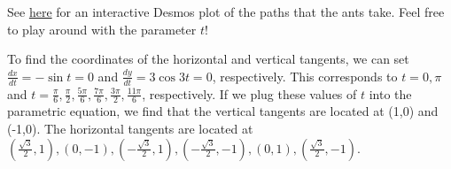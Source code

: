 \begin{enumerate}
\begin{figure}[!ht]
        \end{figure}

        See \href{https://www.desmos.com/calculator/xdoroqqzdz}{here} for an interactive Desmos plot of the paths that the ants take. Feel free to play around with the parameter $t$!
        
        To find the coordinates of the horizontal and vertical tangents, we can set $\frac{dx}{dt}=-\sin{t}=0$ and $\frac{dy}{dt}=3\cos{3t}=0$, respectively. This corresponds to $t=0, \pi$ and $t=\frac{\pi}{6}, \frac{\pi}{2}, \frac{5\pi}{6}, \frac{7\pi}{6}, \frac{3\pi}{2}, \frac{11\pi}{6}$, respectively. If we plug these values of $t$ into the parametric equation, we find that the vertical tangents are located at (1,0) and (-1,0). The horizontal tangents are located at $\left(\frac{\sqrt{3}}{2},1\right), (0,-1), \left(-\frac{\sqrt{3}}{2},1\right), \left(-\frac{\sqrt{3}}{2},-1\right), (0,1), \left(\frac{\sqrt{3}}{2},-1\right)$.
        

\end{enumerate}